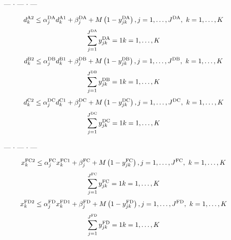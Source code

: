 \documentclass{jarticle}
\begin{document}
\begin{center} --- $ \cdot $ --- $ \cdot $ --- \end{center}
%
\begin{equation}
 d^{\rm A2}_{k} \le \alpha^{\rm DA}_j d^{\rm A1}_{k} + \beta^{\rm DA}_j + M\left(1-y^{\rm DA}_{jk}\right),
 \hfill
 j=1,\ldots,J^{\rm DA}, ~
 k=1,\ldots,K
~~
 \label{eq:BigM_DA}
\end{equation}
%
\begin{equation}
 \sum_{j=1}^{J^{\rm DA}} y^{\rm DA}_{jk} = 1
 \hfill
 k=1,\ldots,K
 ~~
\end{equation}
%
\begin{equation}
 d^{\rm B2}_{k} \le \alpha^{\rm DB}_j d^{\rm B1}_{k} + \beta^{\rm DB}_j + M\left(1-y^{\rm DB}_{jk}\right),
 \hfill
 j=1,\ldots,J^{\rm DB}, ~
 k=1,\ldots,K
~~
 \label{eq:BigM_DB}
\end{equation}
%
\begin{equation}
 \sum_{j=1}^{J^{\rm DB}} y^{\rm DB}_{jk} = 1
 \hfill
 k=1,\ldots,K
 ~~
\end{equation}
%
\begin{equation}
 d^{\rm C2}_{k} \le \alpha^{\rm DC}_j d^{\rm C1}_{k} + \beta^{\rm DC}_j + M\left(1-y^{\rm DC}_{jk}\right),
 \hfill
 j=1,\ldots,J^{\rm DC}, ~
 k=1,\ldots,K
~~
 \label{eq:BigM_DC}
\end{equation}
%
\begin{equation}
 \sum_{j=1}^{J^{\rm DC}} y^{\rm DC}_{jk} = 1
 \hfill
 k=1,\ldots,K
 ~~
\end{equation}
%
\begin{center} --- $ \cdot $ --- $ \cdot $ --- \end{center}
%
\begin{equation}
 x^{\rm FC2}_{k} \le \alpha^{\rm FC}_j x^{\rm FC1}_{k} + \beta^{\rm FC}_j + M\left(1-y^{\rm FC}_{jk}\right),
 \hfill
 j=1,\ldots,J^{\rm FC}, ~
 k=1,\ldots,K
~~
 \label{eq:BigM_FC}
\end{equation}
%
\begin{equation}
 \sum_{j=1}^{J^{\rm FC}} y^{\rm FC}_{jk} = 1
 \hfill
 k=1,\ldots,K
 ~~
\end{equation}
%
\begin{equation}
 x^{\rm FD2}_{k} \le \alpha^{\rm FD}_j x^{\rm FD1}_{k} + \beta^{\rm FD}_j + M\left(1-y^{\rm FD}_{jk}\right),
 \hfill
 j=1,\ldots,J^{\rm FD}, ~
 k=1,\ldots,K
~~
 \label{eq:BigM_FD}
\end{equation}
%
\begin{equation}
 \sum_{j=1}^{J^{\rm FD}} y^{\rm FD}_{jk} = 1
 \hfill
 k=1,\ldots,K
 ~~
\end{equation}
\end{document}
